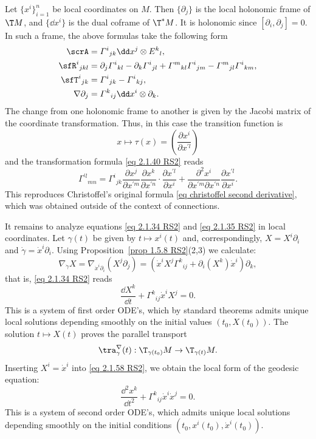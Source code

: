 \begin{rem}\label{rem 2.1.29 RS2}
    Let $\{x^i\}_{i=1}^n$ be local coordinates on $M$. Then $\{\partial_j\}$ is the local holonomic frame of $\T M$, and $\{\dd x^i\}$ is the dual coframe of $\T^\ast M$. It is holonomic since $[\partial_i,\partial_j]=0$. In such a frame, the above formulas take the following form 
    \begin{align}
        \scrA&=\varGamma^i{}_{jk}\dd x^j\otimes E^k{}_l,\\
        \sfR^i{}_{jkl}&=\partial_j\varGamma^i{}_{kl}-\partial_k\varGamma^i{}_{jl}+\varGamma^m{}_{kl}\varGamma^i{}_{jm}-\varGamma^m{}_{jl}\varGamma^i{}_{km},\\
        \sfT^i{}_{jk}&=\varGamma^i{}_{jk}-\varGamma^i{}_{kj},\label{eq torsion holonomic}\\
        \nabla\partial_j&=\varGamma^k{}_{ij}\dd x^i\otimes\partial_k.\label{eq christoffel holonomic}
    \end{align}
    The change from one holonomic frame to another is given by the Jacobi matrix of the coordinate transformation. Thus, in this case the transition function is 
    \[x\mapsto \tau(x)=\left(\frac{\partial x^i}{\partial x^{\prime l}}\right)\]
    and the transformation formula \eqref{eq 2.1.40 RS2} reads 
    \[\varGamma^{\prime l}{}_{mn}=
    \varGamma^i{}_{jk}\frac{\partial x^j}{\partial x^{\prime m}}  \frac{\partial x^k}{\partial x^{\prime n}}\cdot \frac{\partial x^{\prime l}}{\partial x^i}+
    \frac{\partial^2 x^i}{\partial x^{\prime m}\partial x^{\prime n}}\frac{\partial x^{\prime l}}{\partial x^i}.
    \]
    This reproduces Christoffel's original formula \eqref{eq christoffel second derivative}, which was obtained outside of the context of connections.
\end{rem}


It remains to analyze equations \eqref{eq 2.1.34 RS2} and \eqref{eq 2.1.35 RS2} in local coordinates. Let $\gamma(t)$ be given by $t\mapsto x^i(t)$ and, correspondingly, $X=X^i\partial_i$ and $\dot\gamma=\dot x^i\partial_i$. Using Proposition~\ref{prop 1.5.8 RS2}(2,3) we calculate:
\[\nabla_{\dot\gamma}X=\nabla_{\dot x^i\partial_i}(X^j\partial_j)=(\dot x^iX^j\varGamma^k{}_{ij}+\partial_i(X^k)\dot x^i)\partial_k,\]
that is, \eqref{eq 2.1.34 RS2} reads 
\[\frac{\dd X^k}{\dd t}+\varGamma^k{}_{ij}\dot x^i X^j=0.\label{eq 2.1.58 RS2}\]
This is a system of first order ODE's, which by standard theorems admits unique local solutions depending smoothly on the initial values $(t_0,X(t_0))$. The solution $t\mapsto X(t)$ proves the parallel transport 
\[\tra_{\gamma}^{\nabla}(t):\T_{\gamma(t_0)}M\to \T_{\gamma(t)}M.\]
Inserting $X^i=\dot x^i$ into \eqref{eq 2.1.58 RS2}, we obtain the local form of the geodesic equation:
\[\frac{\dd^2 x^k}{\dd t^2}+\varGamma^k{}_{ij}\dot x^i\dot x^j=0.\]
This is a system of second order ODE's, which admits unique local solutions depending smoothly on the initial conditions $(t_0,x^i(t_0),\dot x^i(t_0))$.

